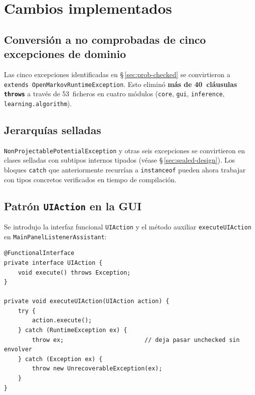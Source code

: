 \documentclass[12pt,a4paper]{article}
\begin{document}
\section{Cambios implementados}
\label{sec:cambios}

\subsection{Conversión a no comprobadas de cinco excepciones de dominio}
\label{sec:impl-unchecked}

Las cinco excepciones identificadas en §\,\ref{sec:prob-checked} se convirtieron
a \texttt{extends OpenMarkovRuntimeException}. Esto eliminó \textbf{más de
40~cláusulas \texttt{throws}} a través de 53~ficheros en cuatro módulos
(\texttt{core}, \texttt{gui}, \texttt{inference}, \texttt{learning.algorithm}).

\subsection{Jerarquías selladas}
\label{sec:impl-sealed}

\texttt{NonProjectablePotentialException} y otras seis excepciones se
convirtieron en clases selladas con subtipos internos tipados (véase
§\,\ref{sec:sealed-design}). Los bloques \texttt{catch} que anteriormente
recurrían a \texttt{instanceof} pueden ahora trabajar con tipos concretos
verificados en tiempo de compilación.

\subsection{Patrón \texttt{UIAction} en la GUI}
\label{sec:impl-uiaction}

Se introdujo la interfaz funcional \texttt{UIAction} y el método auxiliar
\texttt{executeUIAction} en \texttt{MainPanelListenerAssistant}:

\begin{lstlisting}[caption={Interfaz funcional \texttt{UIAction} y método auxiliar}]
@FunctionalInterface
private interface UIAction {
    void execute() throws Exception;
}

private void executeUIAction(UIAction action) {
    try {
        action.execute();
    } catch (RuntimeException ex) {
        throw ex;                       // deja pasar unchecked sin envolver
    } catch (Exception ex) {
        throw new UnrecoverableException(ex);
    }
}
\end{lstlisting}
\end{document}

